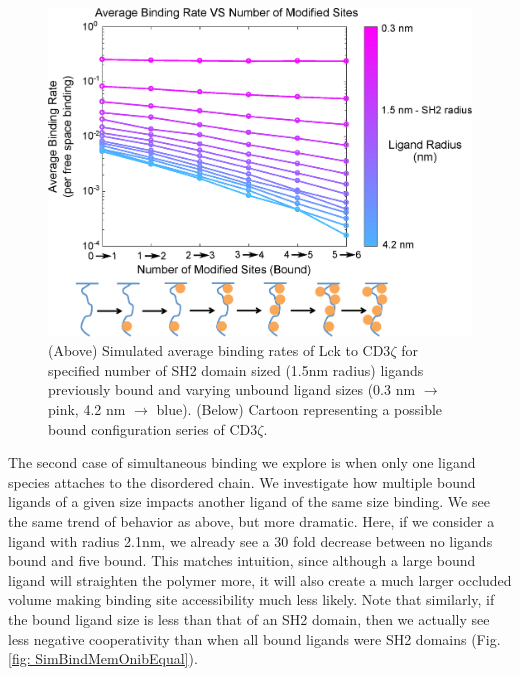 \documentclass[../../AdvancementSummary.tex]{subfiles}
\begin{document}
\begin{figure}[H]
	\begin{center}
		\includegraphics[width=\linewidth]{ResultsFigures/CD3ZetaMultipleBindingMembraneOn/AvgBindVSTotalPhosColorMapLabeled.eps}
		\caption{(Above) Simulated average binding rates of Lck to CD3$\zeta$ for specified number of SH2 domain sized (1.5nm radius) ligands previously bound and varying unbound ligand sizes (0.3 nm $\rightarrow$ pink, 4.2 nm $	\rightarrow$ blue). (Below) Cartoon representing a possible bound configuration series of CD3$\zeta$. \label{fig: SimBindMemOnSH2} }
	\end{center}
\end{figure}


The second case of simultaneous binding we explore is when only one ligand species attaches to the disordered chain. We investigate how multiple bound ligands of a given size impacts another ligand of the same size binding. We see the same trend of behavior as above, but more dramatic. Here, if we consider a ligand with radius 2.1nm, we already see a 30 fold decrease between no ligands bound and five bound. This matches intuition, since although a large bound ligand will straighten the polymer more, it will also create a much larger occluded volume making binding site accessibility much less likely. Note that similarly, if the bound ligand size is less than that of an SH2 domain, then we actually see less negative cooperativity than when all bound ligands were SH2 domains (Fig. \ref{fig: SimBindMemOnibEqual}).
\end{document}
